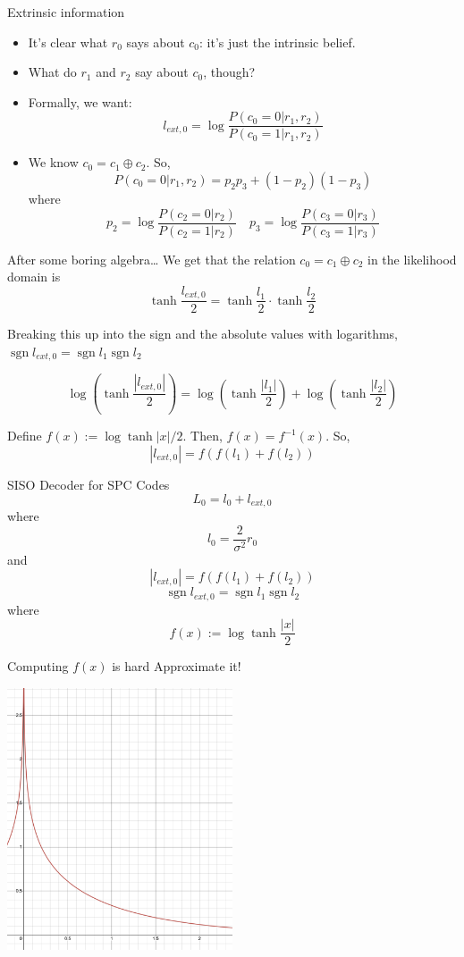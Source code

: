 \documentclass[aspectratio=1610, 10pt]{beamer}
\DeclareMathOperator{\sgn}{sgn}
\begin{document}
\begin{frame}[label={sec:orgd0192a0}]{Extrinsic information}
\begin{itemize}
\item It's clear what \(r_0\) says about \(c_0\): it's just the intrinsic belief.
\item What do \(r_1\) and \(r_2\) say about \(c_0\), though?
\item Formally, we want:
$$l_{ext,0} = \log{\frac{P(c_0=0|r_1,r_2)}{P(c_0=1|r_1,r_2)}}$$
\item We know \(c_0 = c_1 \oplus c_2\). So,
$$P(c_0=0|r_1,r_2) = p_2p_3 + (1-p_2)(1-p_3)$$
where
$$p_2 = \log{\frac{P(c_2=0|r_2)}{P(c_2=1|r_2)}}\quad p_3 =
  \log{\frac{P(c_3=0|r_3)}{P(c_3=1|r_3)}}$$
\end{itemize}
\end{frame}


\begin{frame}[label={sec:org2e369e7}]{After some boring algebra\ldots{}}
We get that the relation \(c_0 = c_1 \oplus c_2\) in the likelihood
domain is
$$\tanh{\frac{l_{ext,0}}{2}} = \tanh{\frac{l_1}{2}}\cdot\tanh{\frac{l_2}{2}}$$

Breaking this up into the sign and the absolute values with logarithms,
\(\sgn{l_{ext,0}} = \sgn{l_1}\sgn{l_2}\)

$$\log{\left(\tanh{\frac{|l_{ext,0}|}{2}}\right)} =
\log{\left(\tanh{\frac{|l_{1}|}{2}}\right)} +
\log{\left(\tanh{\frac{|l_{2}|}{2}}\right)}$$

Define \(f(x) := \log{\tanh{|x|/2}}\). Then, \(f(x) = f^{-1}(x)\). So,
$$|l_{ext,0}| = f(f(l_1) + f(l_2))$$
\end{frame}

\begin{frame}[label={sec:org448f959}]{SISO Decoder for SPC Codes}
$$L_0 = l_0 + l_{ext,0}$$
where
$$l_0 = \frac{2}{\sigma^2}r_0$$
and
$$|l_{ext,0}| = f(f(l_1) + f(l_2))$$
$$\sgn{l_{ext,0}} = \sgn{l_1}\sgn{l_2}$$
where
$$f(x) := \log{\tanh{\frac{|x|}{2}}}$$
\end{frame}

\begin{frame}[label={sec:org6188711}]{Computing \(f(x)\) is hard}
Approximate it!
\begin{center}
\includegraphics[width=0.5\textwidth]{./minsumapprox.png}
\end{center}
\end{frame}
\end{document}
